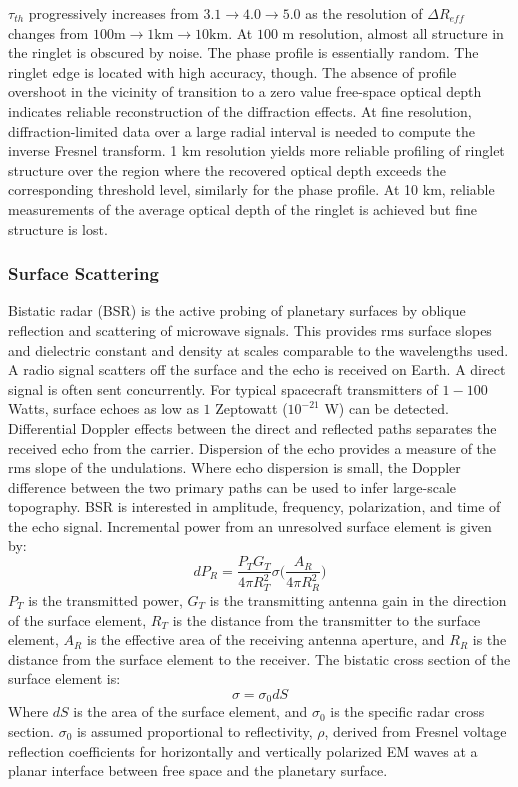 \documentclass{article}
\theoremstyle{mystyle}
\begin{document}
\noindent $\tau_{th}$ progressively increases from $3.1\rightarrow 4.0 \rightarrow 5.0$ as the resolution of $\Delta R_{eff}$ changes from $100\textrm{m}\rightarrow 1\textrm{km}\rightarrow 10\textrm{km}$. At $100$ m resolution, almost all structure in the ringlet is obscured by noise. The phase profile is essentially random. The ringlet edge is located with high accuracy, though. The absence of profile overshoot in the vicinity of transition to a zero value free-space optical depth indicates reliable reconstruction of the diffraction effects. At fine resolution, diffraction-limited data over a large radial interval is needed to compute the inverse Fresnel transform. 1 km resolution yields more reliable profiling of ringlet structure over the region where the recovered optical depth exceeds the corresponding threshold level, similarly for the phase profile. At 10 km, reliable measurements of the average optical depth of the ringlet is achieved but fine structure is lost. 

\subsubsection{Surface Scattering}

Bistatic radar (BSR) is the active probing of planetary surfaces by oblique reflection and scattering of microwave signals. This provides rms surface slopes and dielectric constant and density at scales comparable to the wavelengths used. A radio signal scatters off the surface and the echo is received on Earth. A direct signal is often sent concurrently. For typical spacecraft transmitters of $1-100$ Watts, surface echoes as low as $1$ Zeptowatt ($10^{-21}$ W) can be detected. Differential Doppler effects between the direct and reflected paths separates the received echo from the carrier. Dispersion of the echo provides a measure of the rms slope of the undulations. Where echo dispersion is small, the Doppler difference between the two primary paths can be used to infer large-scale topography. BSR is interested in amplitude, frequency, polarization, and time of the echo signal. Incremental power from an unresolved surface element is given by:
\begin{equation}
dP_{R} = \frac{P_T G_T}{4\pi R_{T}^2}\sigma\bigg(\frac{A_{R}}{4\pi R_{R}^2}\bigg)
\end{equation}
$P_T$ is the transmitted power, $G_T$ is the transmitting antenna gain in the direction of the surface element, $R_T$ is the distance from the transmitter to the surface element, $A_R$ is the effective area of the receiving antenna aperture, and $R_R$ is the distance from the surface element to the receiver. The bistatic cross section of the surface element is:
\begin{equation}
\sigma = \sigma_{0}dS
\end{equation}
Where $dS$ is the area of the surface element, and $\sigma_0$ is the specific radar cross section. $\sigma_0$ is assumed proportional to reflectivity, $\rho$, derived from Fresnel voltage reflection coefficients for horizontally and vertically polarized EM waves at a planar interface between free space and the planetary surface.
\end{document}
